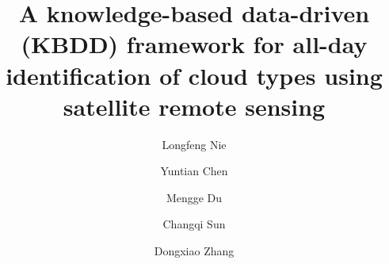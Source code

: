 \documentclass[review]{elsarticle}
\begin{document}


\begin{frontmatter}

    \title{A knowledge-based data-driven (KBDD) framework for all-day identification of cloud types using satellite remote sensing}

    \author[myaddress01,myaddress02]{Longfeng Nie}
    \author[myaddress03]{Yuntian Chen}
    \author[myaddress06]{Mengge Du}
    \author[myaddress01,myaddress02]{Changqi Sun}
    \author[myaddress03,myaddress02,myaddress01]{Dongxiao Zhang}


    \address[myaddress01]{School of Environmental Science and Engineering, Southern University of Science and Technology, Shenzhen 518055, P. R. China}
    \address[myaddress02]{Peng Cheng Laboratory, Shenzhen, 518000, P. R. China}
    \address[myaddress03]{Ningbo Institute of Digital Twin, Eastern Institute of Technology, Ningbo, 315200, P. R. China}
    \address[myaddress06]{College of Engineering, Peking University, Beijing, 100000, P. R. China}


\end{frontmatter}
\end{document}
